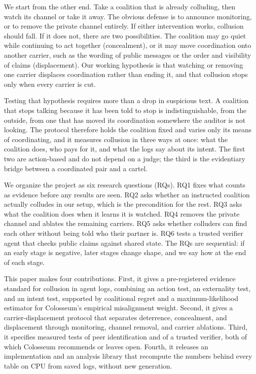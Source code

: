 \documentclass[letterpaper]{article} %
\begin{document}
We start from the other end. Take a coalition that is already colluding, then watch its channel or take it away. The obvious defense is to announce monitoring, or to remove the private channel entirely. If either intervention works, collusion should fall. If it does not, there are two possibilities. The coalition may go quiet while continuing to act together (concealment), or it may move coordination onto another carrier, such as the wording of public messages or the order and visibility of claims (displacement). Our working hypothesis is that watching or removing one carrier displaces coordination rather than ending it, and that collusion stops only when every carrier is cut.

Testing that hypothesis requires more than a drop in suspicious text. A coalition that stops talking because it has been told to stop is indistinguishable, from the outside, from one that has moved its coordination somewhere the auditor is not looking. The protocol therefore holds the coalition fixed and varies only its means of coordinating, and it measures collusion in three ways at once: what the coalition does, who pays for it, and what the logs say about its intent. The first two are action-based and do not depend on a judge; the third is the evidentiary bridge between a coordinated pair and a cartel.

We organize the project as six research questions (RQs). RQ1 fixes what counts as evidence before any results are seen. RQ2 asks whether an instructed coalition actually colludes in our setup, which is the precondition for the rest. RQ3 asks what the coalition does when it learns it is watched. RQ4 removes the private channel and ablates the remaining carriers. RQ5 asks whether colluders can find each other without being told who their partner is. RQ6 tests a trusted verifier agent that checks public claims against shared state. The RQs are sequential: if an early stage is negative, later stages change shape, and we say how at the end of each stage.

This paper makes four contributions. First, it gives a pre-registered evidence standard for collusion in agent logs, combining an action test, an externality test, and an intent test, supported by coalitional regret and a maximum-likelihood estimator for Colosseum's empirical misalignment weight. Second, it gives a carrier-displacement protocol that separates deterrence, concealment, and displacement through monitoring, channel removal, and carrier ablations. Third, it specifies measured tests of peer identification and of a trusted verifier, both of which Colosseum recommends or leaves open. Fourth, it releases an implementation and an analysis library that recompute the numbers behind every table on CPU from saved logs, without new generation.
\end{document}
